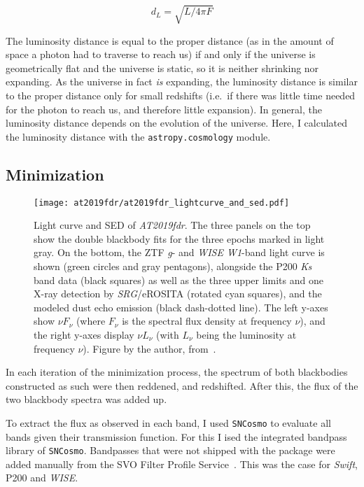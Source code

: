\begin{equation}
    d_L = \sqrt{L/4\pi F}
\end{equation}

The luminosity distance is equal to the proper distance (as in the amount of space a photon had to traverse to reach us) if and only if the universe is geometrically flat and the universe is static, so it is neither shrinking nor expanding. As the universe in fact \textit{is} expanding, the luminosity distance is similar to the proper distance only for small redshifts (i.e.\ if there was little time needed for the photon to reach us, and therefore little expansion). In general, the luminosity distance depends on the evolution of the universe. Here, I calculated the luminosity distance with the \texttt{astropy.cosmology} module.

\subsection{Minimization}

\begin{figure*}[htb]
    \texttt{[image: at2019fdr/at2019fdr\_lightcurve\_and\_sed.pdf]}
    \caption[\emph{AT2019fdr} light and SED]{Light curve and SED of \emph{AT2019fdr}. The three panels on the top show the double blackbody fits for the three epochs marked in light gray. On the bottom, the ZTF \textit{g}- and \textit{WISE W1}-band light curve is shown (green circles and gray pentagons), alongside the P200 \textit{Ks} band data (black squares) as well as the three upper limits and one X-ray detection by \textit{SRG}/eROSITA (rotated cyan squares), and the modeled dust echo emission (black dash-dotted line). The left y-axes show $\nu F_\nu$ (where $F_\nu$ is the spectral flux density at frequency $\nu$), and the right y-axes display $\nu L_\nu$ (with $L_\nu$ being the luminosity at frequency $\nu$). Figure by the author, from~\cite{Reusch2022}.}
\end{figure*}

In each iteration of the minimization process, the spectrum of both blackbodies constructed as such were then reddened, and redshifted. After this, the flux of the two blackbody spectra was added up.

To extract the flux as observed in each band, I used \texttt{SNCosmo} to evaluate all bands given their transmission function. For this I ised the integrated bandpass library of \texttt{SNCosmo}. Bandpasses that were not shipped with the package were added manually from the SVO Filter Profile Service~. This was the case for \textit{Swift}, P200 and \textit{WISE}.

